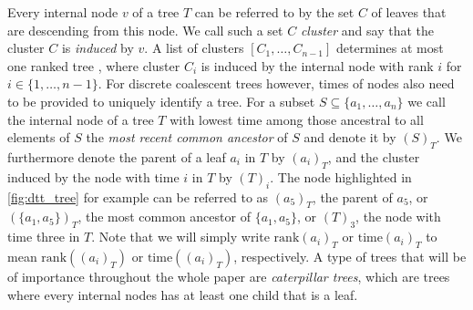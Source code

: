 \documentclass[11pt]{amsart}
\newcommand{\rank}{\mathrm{rank}}
\newcommand{\ntime}{\mathrm{time}}
\begin{document}
Every internal node $v$ of a tree $T$ can be referred to by the set $C$ of leaves that are descending from this node.
We call such a set $C$ \emph{cluster} and say that the cluster $C$ is \emph{induced} by $v$.
A list of clusters $[C_1, \ldots, C_{n-1}]$ determines at most one ranked tree \autocite{Collienne2020-iu}, where cluster $C_i$ is induced by the internal node with rank $i$ for $i \in \{1, \ldots, n-1\}$.
For discrete coalescent trees however, times of nodes also need to be provided to uniquely identify a tree.
For a subset $S \subseteq \{a_1, \ldots, a_n\}$ we call the internal node of a tree $T$ with lowest time among those ancestral to all elements of $S$ the \emph{most recent common ancestor} of $S$ and denote it by $(S)_T$.
We furthermore denote the parent of a leaf $a_i$ in $T$ by $(a_i)_T$, and the cluster induced by the node with time $i$ in $T$ by $(T)_i$.
The node highlighted in \autoref{fig:dtt_tree} for example can be referred to as $(a_5)_T$, the parent of $a_5$, or $(\{a_1, a_5\})_T$, the most common ancestor of $\{a_1, a_5\}$, or $(T)_3$, the node with time three in $T$.
Note that we will simply write $\rank(a_i)_T$ or $\ntime(a_i)_T$ to mean $\rank((a_i)_T)$ or $\ntime((a_i)_T)$, respectively.
A type of trees that will be of importance throughout the whole paper are \emph{caterpillar trees}, which are trees where every internal nodes has at least one child that is a leaf.
\end{document}
